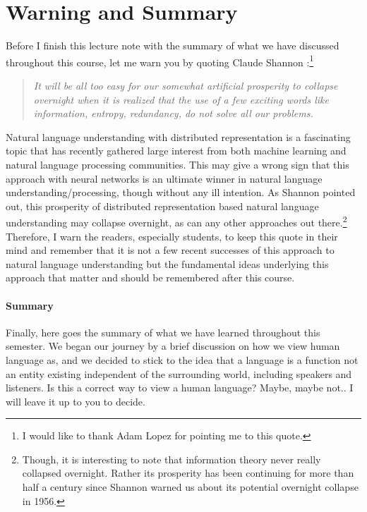 \documentclass{report}
\begin{document}
\section{Warning and Summary}

Before I finish this lecture note with the summary of what we have discussed
throughout this course, let me warn you by quoting Claude Shannon
\cite{shannon1956bandwagon}:\footnote{
    I would like to thank Adam Lopez for pointing me to this quote.
}

\begin{quote}
    \it
    It will be all too easy for our somewhat artificial prosperity to collapse
    overnight when it is realized that the use of a few exciting words like
    information, entropy, redundancy, do not solve all our problems.
\end{quote}

Natural language understanding with distributed representation is a fascinating
topic that has recently gathered large interest from both machine learning and
natural language processing communities. This may give a wrong sign that this
approach with neural networks is an ultimate winner in natural language
understanding/processing, though without any ill intention. As Shannon pointed
out, this prosperity of distributed representation based natural language
understanding may collapse overnight, as can any other approaches out
there.\footnote{
    Though, it is interesting to note that information theory never really
    collapsed overnight. Rather its prosperity has been continuing for more than
    half a century since Shannon warned us about its potential overnight
    collapse in 1956.
} Therefore, I warn the readers, especially students, to keep this quote in
their mind and remember that it is not a few recent successes of this approach
to natural language understanding but the fundamental ideas underlying this
approach that matter and should be remembered after this course.

\paragraph{Summary}

Finally, here goes the summary of what we have learned throughout this semester.
We began our journey by a brief discussion on how we view human language as, and
we decided to stick to the idea that a language is a function not an entity
existing independent of the surrounding world, including speakers and listeners.
Is this a correct way to view a human language? Maybe, maybe not.. I will leave
it up to you to decide.
\end{document}
